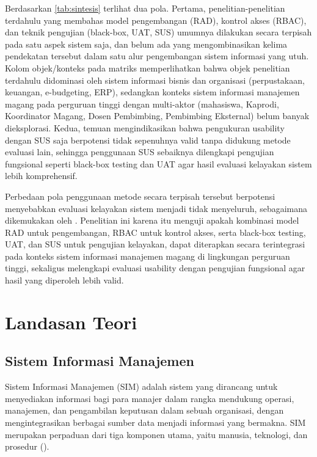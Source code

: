 Berdasarkan \cref{tab:sintesis} terlihat dua pola. Pertama, penelitian-penelitian 
terdahulu yang membahas model pengembangan (RAD), kontrol akses (RBAC), dan teknik 
pengujian (black-box, UAT, SUS) umumnya dilakukan secara terpisah pada satu aspek 
sistem saja, dan belum ada yang mengombinasikan kelima pendekatan tersebut dalam 
satu alur pengembangan sistem informasi yang utuh. Kolom objek/konteks pada matriks 
memperlihatkan bahwa objek penelitian terdahulu didominasi oleh sistem informasi 
bisnis dan organisasi (perpustakaan, keuangan, e-budgeting, ERP), sedangkan konteks 
sistem informasi manajemen magang pada perguruan tinggi dengan multi-aktor 
(mahasiswa, Kaprodi, Koordinator Magang, Dosen Pembimbing, Pembimbing Eksternal) 
belum banyak dieksplorasi. Kedua, temuan \cite{Fiandhika2024} 
mengindikasikan bahwa pengukuran usability dengan SUS saja berpotensi tidak 
sepenuhnya valid tanpa didukung metode evaluasi lain, sehingga penggunaan SUS 
sebaiknya dilengkapi pengujian fungsional seperti black-box testing dan UAT agar 
hasil evaluasi kelayakan sistem lebih komprehensif.

Perbedaan pola penggunaan metode secara terpisah tersebut berpotensi menyebabkan 
evaluasi kelayakan sistem menjadi tidak menyeluruh, sebagaimana dikemukakan oleh 
\cite{Fiandhika2024}. Penelitian ini karena itu menguji apakah kombinasi 
model RAD untuk pengembangan, RBAC untuk kontrol akses, serta black-box testing, 
UAT, dan SUS untuk pengujian kelayakan, dapat diterapkan secara terintegrasi pada 
konteks sistem informasi manajemen magang di lingkungan perguruan tinggi, sekaligus 
melengkapi evaluasi usability dengan pengujian fungsional agar hasil yang diperoleh 
lebih valid.

\section{Landasan Teori}

\subsection{Sistem Informasi Manajemen}
Sistem Informasi Manajemen (SIM) adalah sistem yang dirancang untuk menyediakan 
informasi bagi para manajer dalam rangka mendukung operasi, manajemen, dan 
pengambilan keputusan dalam sebuah organisasi, dengan mengintegrasikan berbagai 
sumber data menjadi informasi yang bermakna. SIM merupakan perpaduan dari tiga 
komponen utama, yaitu manusia, teknologi, dan prosedur (\cite{SafiraArmah2024}).


